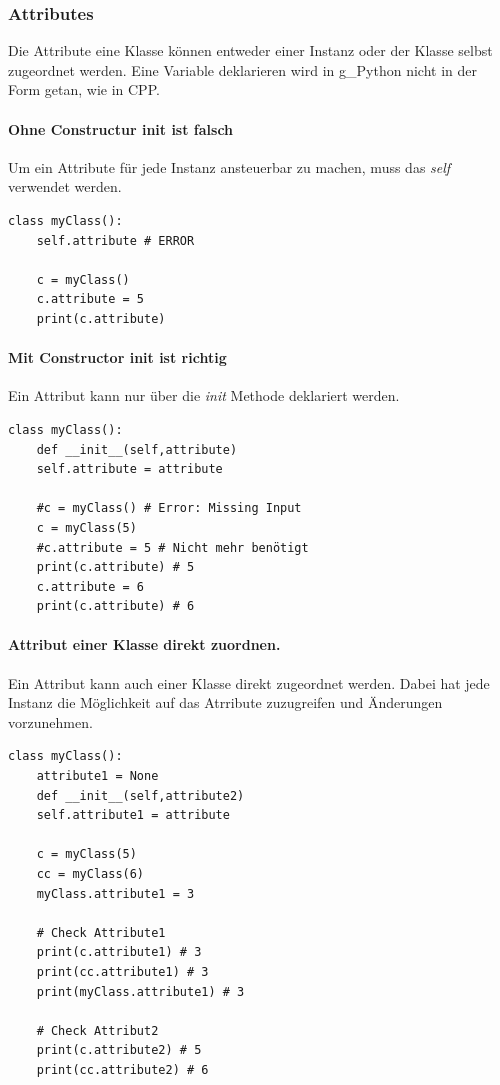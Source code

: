 \subsubsection{Attributes}
Die Attribute eine Klasse können entweder einer Instanz oder der Klasse selbst zugeordnet werden.
Eine Variable deklarieren wird in \gls{g_Python} nicht in der Form getan, wie in \gls{CPP}.\\

\paragraph*{Ohne Constructur init ist falsch}
Um ein Attribute für jede Instanz ansteuerbar zu machen, muss das \textit{self} verwendet werden.
\begin{lstlisting}[style=python]
	class myClass():
	self.attribute # ERROR
	
	c = myClass()
	c.attribute = 5
	print(c.attribute)
\end{lstlisting}

\paragraph*{Mit Constructor init ist richtig}
Ein Attribut kann nur über die \textit{init} Methode deklariert werden.
\begin{lstlisting}[style=python]
	class myClass():
	def __init__(self,attribute)
	self.attribute = attribute		
	
	#c = myClass() # Error: Missing Input
	c = myClass(5)
	#c.attribute = 5 # Nicht mehr benötigt
	print(c.attribute) # 5
	c.attribute = 6
	print(c.attribute) # 6
\end{lstlisting}

\paragraph*{Attribut einer Klasse direkt zuordnen.}
Ein Attribut kann auch einer Klasse direkt zugeordnet werden. Dabei hat jede Instanz die Möglichkeit auf das Atrribute zuzugreifen und Änderungen vorzunehmen.
\begin{lstlisting}[style=python]
	class myClass():
	attribute1 = None
	def __init__(self,attribute2)
	self.attribute1 = attribute	
	
	c = myClass(5)
	cc = myClass(6)
	myClass.attribute1 = 3
	
	# Check Attribute1
	print(c.attribute1) # 3
	print(cc.attribute1) # 3
	print(myClass.attribute1) # 3 
	
	# Check Attribut2
	print(c.attribute2) # 5
	print(cc.attribute2) # 6
\end{lstlisting}

